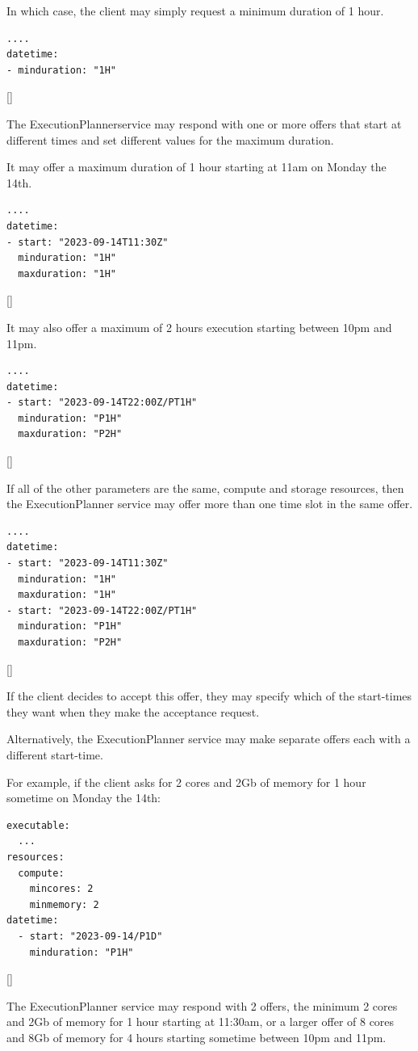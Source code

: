 \documentclass[11pt,a4paper]{ivoa}
\newcommand{\execplanner} {ExecutionPlanner}
\begin{document}
In which case, the client may simply request a minimum duration of 1 hour.
\begin{lstlisting}[]
....
datetime:
- minduration: "1H"
\end{lstlisting}[]

The \execplanner service may respond with one or more offers that start at different times and
set different values for the maximum duration.

It may offer a maximum duration of 1 hour starting at 11am on Monday the 14th.
\begin{lstlisting}[]
....
datetime:
- start: "2023-09-14T11:30Z"
  minduration: "1H"
  maxduration: "1H"
\end{lstlisting}[]

It may also offer a maximum of 2 hours execution starting between 10pm and 11pm.
\begin{lstlisting}[]
....
datetime:
- start: "2023-09-14T22:00Z/PT1H"
  minduration: "P1H"
  maxduration: "P2H"
\end{lstlisting}[]

If all of the other parameters are the same, compute and storage resources, then the
\execplanner{} service may offer more than one time slot in the same offer.

\begin{lstlisting}[]
....
datetime:
- start: "2023-09-14T11:30Z"
  minduration: "1H"
  maxduration: "1H"
- start: "2023-09-14T22:00Z/PT1H"
  minduration: "P1H"
  maxduration: "P2H"
\end{lstlisting}[]

If the client decides to accept this offer, they may specify which of the start-times
they want when they make the acceptance request.

Alternatively, the \execplanner{} service may make separate offers each with a different start-time.

For example, if the client asks for 2 cores and 2Gb of memory for 1 hour sometime on Monday the 14th:
\begin{lstlisting}[]
executable:
  ...
resources:
  compute:
    mincores: 2
    minmemory: 2
datetime:
  - start: "2023-09-14/P1D"
    minduration: "P1H"
\end{lstlisting}[]

The  \execplanner{} service may respond with 2 offers,
the minimum 2 cores and 2Gb of memory for 1 hour starting at 11:30am,
or a larger offer of 8 cores and 8Gb of memory for 4 hours starting sometime between 10pm and 11pm.
\end{document}
